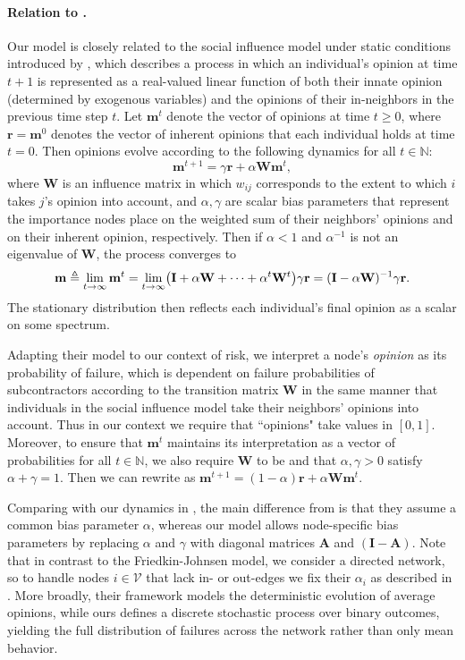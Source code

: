 \documentclass[mnsc,nonblindrev]{informs3}
\newcommand{\rvec}{\mathbf{r}}
\newcommand{\V}{\mathcal{V}}
\newcommand{\A}{\mathbf{A}}
\newcommand{\W}{\mathbf{W}}
\newcommand{\I}{\mathbf{I}}
\newcommand{\mean}{m}
\newcommand{\meanvec}{\mathbf{\mean}}
\let\originalleft\left
\let\originalright\right
\renewcommand{\left}{\mathopen{}\mathclose\bgroup\originalleft}
\renewcommand{\right}{\aftergroup\egroup\originalright}
\begin{document}
\paragraph{Relation to \citet{FriedkinJohnsen}.} 
Our model is closely related to the social influence model under static conditions introduced by \citet{FriedkinJohnsen}, which describes a process in which an individual's opinion at time $t + 1$ is represented as a real-valued linear function of both their innate opinion (determined by exogenous variables) and the opinions of their in-neighbors in the previous time step $t$.
Let $\meanvec^t$ denote the vector of opinions at time $t\geq 0$, where $\rvec=\meanvec^0$ denotes the vector of inherent opinions that each individual holds at time $t=0$.
Then opinions evolve according to the following dynamics for all $t \in \mathbb{N}$:
\begin{equation}\label{eq:fj_dynamic}
    \meanvec^{t+1} = \gamma \rvec + \alpha \W \meanvec^{t},
\end{equation}
where $\W$ is an influence matrix in which $w_{ij}$ corresponds to the extent to which $i$ takes $j$'s opinion into account, and $\alpha,\gamma$ are scalar bias parameters that represent the importance nodes place on the weighted sum of their neighbors' opinions and on their inherent opinion, respectively.
Then if $\alpha<1$ and $\alpha^{-1}$ is not an eigenvalue of $\W$, the process converges to
\[
    \meanvec \triangleq \lim_{t\rightarrow\infty} \meanvec^t = \lim_{t\rightarrow\infty} \left( \I + \alpha\W + \cdots + \alpha^t\W^t \right)\gamma\rvec = (\I-\alpha\W)^{-1}\gamma\rvec.
\]
The stationary distribution then reflects each individual's final opinion as a scalar on some spectrum.

Adapting their model to our context of risk, we interpret a node's {\em opinion} as its probability of failure, which is dependent on failure probabilities of subcontractors according to the transition matrix $\W$ in the same manner that individuals in the social influence model take their neighbors' opinions into account.
Thus in our context we require that ``opinions" take values in $[0,1]$.
Moreover, to ensure that $\meanvec^t$ maintains its interpretation as a vector of probabilities for all $t\in\mathbb{N}$, we also require $\W$ to be  and that $\alpha,\gamma>0$ satisfy $\alpha+\gamma=1$.
Then we can rewrite  as
\(
    \meanvec^{t+1} = (1-\alpha)\rvec + \alpha\W\meanvec^{t}.
\)

Comparing with our dynamics in , the main difference from \citet{FriedkinJohnsen} is that they assume a common bias parameter $\alpha$, whereas our model allows node-specific bias parameters by replacing $\alpha$ and $\gamma$ with diagonal matrices $\A$ and $(\I-\A)$. Note that in contrast to the Friedkin-Johnsen model, we consider a directed network, so to handle nodes $i \in \V$ that lack in- or out-edges we fix their $\alpha_i$ as described in . More broadly, their framework models the deterministic evolution of average opinions, while ours defines a discrete stochastic process over binary outcomes, yielding the full distribution of failures across the network rather than only mean behavior.
\end{document}
